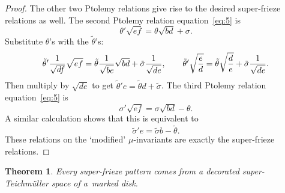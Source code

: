 \documentclass[pdftex]{sigma}
\numberwithin{equation}{section}
\newtheorem{Theorem}{Theorem}[section]
\begin{document}
\begin{proof}
The other two Ptolemy relations give rise to the desired super-frieze relations as well. The second Ptolemy relation equation~\eqref{eq:5} is \[\theta'\sqrt{ef}=\theta\sqrt{bd}+\sigma. \]
Substitute $\theta$'s with the $\tilde\theta$'s:
\begin{gather*}\tilde\theta'\frac{1}{\sqrt{df} }\sqrt{ef}=\tilde\theta\frac{1}{\sqrt{be}}\sqrt{bd}+\tilde\sigma\frac{1}{\sqrt{de}},\qquad
 \tilde\theta'\sqrt{\frac{e}{d}}= \tilde\theta\sqrt{d\over e}+\tilde\sigma\frac{1}{\sqrt{de}}.\end{gather*}
Then multiply by $\sqrt{de}$ to get
$\tilde\theta'e= \tilde\theta d+\tilde\sigma$.
The third Ptolemy relation equation~\eqref{eq:5} is
\[\sigma'\sqrt{ef}=\sigma\sqrt{bd}-\theta.\]
A similar calculation shows that this is equivalent to
\[\tilde\sigma'e=\tilde\sigma b-\tilde\theta.\]
These relations on the `modified' $\mu$-invariants are exactly the super-frieze relations.
\end{proof}

\begin{Theorem}
 Every super-frieze pattern comes from a decorated super-Teichm\"uller space of a~marked disk.
\end{Theorem}
\end{document}
